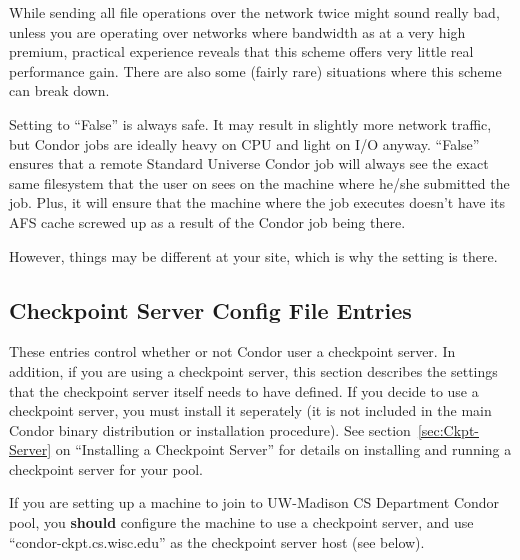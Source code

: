 \begin{description}
  While sending all file operations over the network twice might sound
  really bad, unless you are operating over networks where bandwidth
  as at a very high premium, practical experience reveals that this
  scheme offers very little real performance gain.  There are also
  some (fairly rare) situations where this scheme can break down.
  
  Setting  to ``False'' is always safe.  It may result
  in slightly more network traffic, but Condor jobs are ideally heavy
  on CPU and light on I/O anyway.  ``False'' ensures that a remote
  Standard Universe Condor job will always see the exact same
  filesystem that the user on sees on the machine where he/she
  submitted the job.  Plus, it will ensure that the machine where the
  job executes doesn't have its AFS cache screwed up as a result of
  the Condor job being there.  
  
  However, things may be different at your site, which is why the
  setting is there.

\end{description}

\subsection{Checkpoint Server Config File Entries}
\label{sec:Checkpoint-Server-Config-File-Entries}

These entries control whether or not Condor user a checkpoint server.
In addition, if you are using a checkpoint server, this section
describes the settings that the checkpoint server itself needs to have
defined.  If you decide to use a checkpoint server, you must install
it seperately (it is not included in the main Condor binary
distribution or installation procedure).  See
section~\ref{sec:Ckpt-Server} on ``Installing a Checkpoint Server''
for details on installing and running a checkpoint server for your
pool.

\Note If you are setting up a machine to join to UW-Madison CS
Department Condor pool, you \textbf{should} configure the machine to
use a checkpoint server, and use ``condor-ckpt.cs.wisc.edu'' as the
checkpoint server host (see below).

